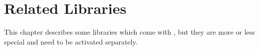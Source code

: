
\chapter{Related Libraries}

This chapter describes some libraries which come with \PGFPlots{}, but they are
more or less special and need to be activated separately.

% 















